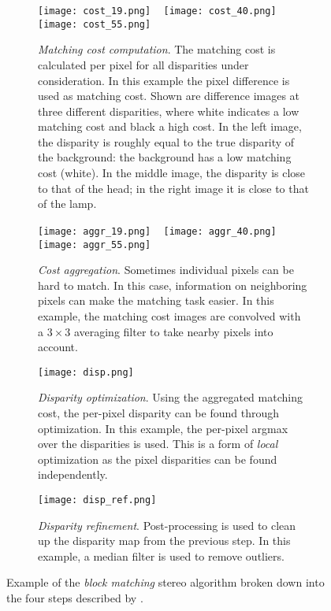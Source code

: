\begin{figure}
\centering
\begin{subfigure}[b]{0.9\textwidth}
\centering
\texttt{[image: cost\_19.png]}
~
\texttt{[image: cost\_40.png]}
~
\texttt{[image: cost\_55.png]}
\caption{\emph{Matching cost computation}. The matching cost is calculated per pixel for all disparities under consideration. In this example the pixel difference is used as matching cost. Shown are difference images at three different disparities, where white indicates a low matching cost and black a high cost. In the left image, the disparity is roughly equal to the true disparity of the background: the background has a low matching cost (white). In the middle image, the disparity is close to that of the head; in the right image it is close to that of the lamp.}
\end{subfigure}

\begin{subfigure}[b]{0.9\textwidth}
\centering
\texttt{[image: aggr\_19.png]}
~
\texttt{[image: aggr\_40.png]}
~
\texttt{[image: aggr\_55.png]}
\caption{\emph{Cost aggregation}. Sometimes individual pixels can be hard to match. In this case, information on neighboring pixels can make the matching task easier. In this example, the matching cost images are convolved with a $3\times 3$ averaging filter to take nearby pixels into account.}
\end{subfigure}

\begin{subfigure}[b]{0.9\textwidth}
\centering
\texttt{[image: disp.png]}
\caption{\emph{Disparity optimization}. Using the aggregated matching cost, the per-pixel disparity can be found through optimization. In this example, the per-pixel argmax over the disparities is used. This is a form of \emph{local} optimization as the pixel disparities can be found independently.}
\end{subfigure}

\begin{subfigure}[b]{0.9\textwidth}
\centering
\texttt{[image: disp\_ref.png]}
\caption{\emph{Disparity refinement}. Post-processing is used to clean up the disparity map from the previous step. In this example, a median filter is used to remove outliers.}
\end{subfigure}
\caption{Example of the \emph{block matching} stereo algorithm broken down into the four steps described by \citet{Scharstein2002}.}
\label{fig:stereo_example}
\end{figure}

